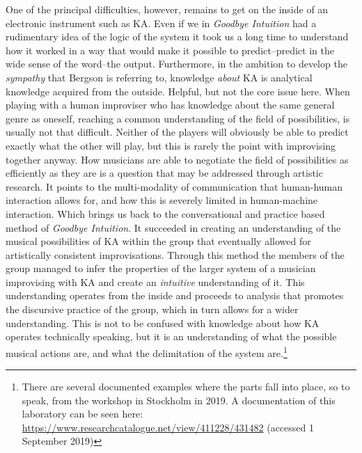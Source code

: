 \documentclass[11pt]{article}
\begin{document}
One of the principal difficulties, however, remains to get on the inside of an electronic instrument such as KA. Even if we in \emph{Goodbye Intuition} had a rudimentary idea of the logic of the system it took us a long time to understand how it worked in a way that would make it possible to predict--predict in the wide sense of the word--the output. Furthermore, in the ambition to develop the \emph{sympathy} that Bergson is referring to, knowledge \emph{about} KA is analytical knowledge acquired from the outside. Helpful, but not the core issue here. When playing with a human improviser who has knowledge about the same general genre as oneself, reaching a common understanding of the field of possibilities, is usually not that difficult. Neither of the players will obviously be able to predict exactly what the other will play, but this is rarely the point with improvising together anyway. How musicians are able to negotiate the field of possibilities as efficiently as they are is a question that may be addressed through artistic research. It points to the multi-modality of communication that human-human interaction allows for, and how this is severely limited in human-machine interaction. Which brings us back to the conversational and practice based method of \emph{Goodbye Intuition}. It succeeded in creating an understanding of the musical possibilities of KA within the group that eventually allowed for artistically consistent improvisations. Through this method the members of the group managed to infer the properties of the larger system of a musician improvising with KA and create an \emph{intuitive} understanding of it. This understanding operates from the inside and proceeds to analysis that promotes the discursive practice of the group, which in turn allows for a wider understanding. This is not to be confused with knowledge about how KA operates technically speaking, but it is an understanding of what the possible musical actions are, and what the delimitation of the system are.\footnote{There are several documented examples where the parts fall into place, so to speak, from the workshop in Stockholm in 2019. A documentation of this laboratory can be seen here: \url{https://www.researchcatalogue.net/view/411228/431482} (accessed 1 September 2019)} 
\end{document}
